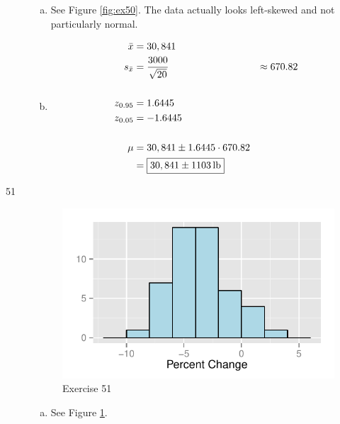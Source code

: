 \documentclass[letterpaper, landscape]{exam}
\begin{document}
\begin{description}
        \begin{enumerate}[(a)]
          \item See Figure \ref{fig:ex50}. The data actually looks left-skewed
            and not particularly normal.

          \item
            \begin{align*}
              \bar{x}     & = 30,841 \\
              s_{\bar{x}} & = \frac{3000}{\sqrt{20}}
                          & \approx 670.82 \\
              \\
              z_{0.95} & = 1.6445 \\
              z_{0.05} & = -1.6445 \\
              \\
              \mu & = 30,841 \pm 1.6445 \cdot 670.82 \\
                  & = \boxed{ \unit[30,841 \pm 1103]{lb} } \\
            \end{align*}
        \end{enumerate}

      \item[51]
        \begin{figure}[H]
          \centering
          \includegraphics{ex51.pdf}
          \caption{Exercise 51}
          \label{fig:ex51}
        \end{figure}

        \begin{enumerate}[(a)]
          \item See Figure \ref{fig:ex51}. 


\end{enumerate}
\end{description}
\end{document}
